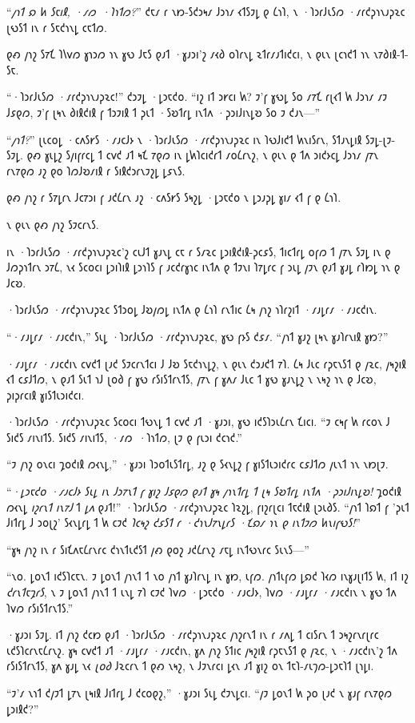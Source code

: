 “\emph{𐑢𐑪𐑑 𐑸 𐑿 𐑕𐑱𐑦𐑙, ·𐑥𐑼~·𐑐𐑪𐑑𐑼?}” 𐑒𐑱𐑥 𐑩 𐑯𐑽-𐑕𐑒𐑮𐑰𐑥 𐑓𐑮𐑪𐑥 𐑬𐑑𐑕𐑲𐑛 𐑞 𐑖𐑪𐑐, 𐑯 ·𐑐𐑮𐑩𐑓𐑧𐑕𐑼 ·𐑥𐑩𐑒𐑜𐑪𐑯𐑨𐑜𐑷𐑤 𐑚𐑻𐑕𐑑 𐑦𐑯 𐑩 𐑕𐑱𐑒𐑪𐑯𐑛 𐑤𐑱𐑑𐑼.

𐑞𐑺 𐑢𐑪𐑟 𐑕𐑳𐑗 𐑐𐑘𐑫𐑼 𐑣𐑪𐑮𐑼 𐑪𐑯 𐑣𐑻 𐑓𐑱𐑕 𐑞𐑨𐑑 ·𐑣𐑨𐑮𐑦'𐑟 𐑥𐑬𐑔 𐑴𐑐𐑩𐑯𐑛 𐑷𐑑𐑩𐑥𐑨𐑑𐑦𐑒𐑤𐑦, 𐑯 𐑞𐑧𐑯 𐑚𐑤𐑪𐑒𐑑 𐑪𐑯 𐑯𐑳𐑔𐑦𐑙-𐑑-𐑕𐑱.

“·𐑐𐑮𐑩𐑓𐑧𐑕𐑼 ·𐑥𐑩𐑒𐑜𐑪𐑯𐑨𐑜𐑷𐑤!” 𐑒𐑮𐑲𐑛 ·𐑛𐑮𐑱𐑒𐑴. “𐑦𐑟 𐑦𐑑 𐑮𐑾𐑤𐑦 𐑿? 𐑲'𐑝 𐑣𐑻𐑛 𐑕𐑴 𐑥𐑳𐑗 𐑩𐑚𐑬𐑑 𐑿 𐑓𐑮𐑪𐑥 𐑥𐑲 𐑓𐑭𐑞𐑼, 𐑲'𐑝 𐑚𐑰𐑯 𐑔𐑦𐑙𐑒𐑦𐑙 𐑝 𐑑𐑮𐑲𐑦𐑙 𐑑 𐑜𐑧𐑑 ·𐑕𐑹𐑑𐑩𐑛 𐑦𐑯𐑑𐑵 ·𐑜𐑮𐑦𐑓𐑦𐑯𐑛𐑹 𐑕𐑴 𐑲 𐑒𐑨𐑯—”

“\emph{𐑢𐑪𐑑?}” 𐑚𐑧𐑤𐑴𐑛 ·𐑤𐑵𐑕𐑾𐑕 ·𐑥𐑨𐑤𐑓𐑶 𐑯 ·𐑐𐑮𐑩𐑓𐑧𐑕𐑼 ·𐑥𐑩𐑒𐑜𐑪𐑯𐑨𐑜𐑷𐑤 𐑦𐑯 𐑐𐑻𐑓𐑦𐑒𐑑 𐑿𐑯𐑦𐑕𐑩𐑯, 𐑕𐑑𐑨𐑯𐑛𐑦𐑙 𐑕𐑲𐑛-𐑚𐑲-𐑕𐑲𐑛. 𐑞𐑺 𐑣𐑧𐑛𐑟 𐑕𐑢𐑦𐑝𐑩𐑤𐑛 𐑑 𐑤𐑫𐑒 𐑨𐑑 𐑰𐑗 𐑳𐑞𐑼 𐑦𐑯 𐑛𐑿𐑐𐑤𐑦𐑒𐑩𐑑 𐑥𐑴𐑖𐑩𐑯𐑟, 𐑯 𐑞𐑧𐑯 𐑞 𐑑𐑵 𐑮𐑦𐑒𐑶𐑤𐑛 𐑓𐑮𐑪𐑥 𐑢𐑳𐑯 𐑩𐑯𐑳𐑞𐑼 𐑨𐑟 𐑞𐑴 𐑐𐑼𐑓𐑹𐑥𐑦𐑙 𐑩 𐑕𐑦𐑙𐑒𐑮𐑩𐑯𐑲𐑟𐑛 𐑛𐑭𐑯𐑕.

𐑞𐑺 𐑢𐑪𐑟 𐑩 𐑕𐑳𐑛𐑩𐑯 𐑓𐑤𐑳𐑮𐑦 𐑝 𐑨𐑒𐑖𐑩𐑯 𐑨𐑟 ·𐑤𐑵𐑕𐑾𐑕 𐑕𐑰𐑟𐑛 ·𐑛𐑮𐑱𐑒𐑴 𐑯 𐑛𐑮𐑨𐑜𐑛 𐑣𐑦𐑥 𐑬𐑑 𐑝 𐑞 𐑖𐑪𐑐.

𐑯 𐑞𐑧𐑯 𐑞𐑺 𐑢𐑪𐑟 𐑕𐑲𐑤𐑩𐑯𐑕.

𐑦𐑯 ·𐑐𐑮𐑩𐑓𐑧𐑕𐑼 ·𐑥𐑩𐑒𐑜𐑪𐑯𐑨𐑜𐑷𐑤'𐑟 𐑤𐑧𐑓𐑑 𐑣𐑨𐑯𐑛 𐑤𐑱 𐑩 𐑕𐑥𐑷𐑤 𐑛𐑮𐑦𐑙𐑒𐑦𐑙-𐑜𐑤𐑭𐑕, 𐑑𐑦𐑤𐑑𐑩𐑛 𐑴𐑝𐑼 𐑑 𐑢𐑳𐑯 𐑕𐑲𐑛 𐑦𐑯 𐑞 𐑓𐑼𐑜𐑪𐑑𐑩𐑯 𐑮𐑳𐑖, 𐑯𐑬 𐑕𐑤𐑴𐑤𐑦 𐑛𐑮𐑦𐑐𐑦𐑙 𐑛𐑮𐑪𐑐𐑕 𐑝 𐑨𐑤𐑒𐑩𐑣𐑪𐑤 𐑦𐑯𐑑𐑵 𐑞 𐑑𐑲𐑯𐑦 𐑐𐑳𐑛𐑩𐑤 𐑝 𐑮𐑧𐑛 𐑢𐑲𐑯 𐑞𐑨𐑑 𐑣𐑨𐑛 𐑩𐑐𐑽𐑛 𐑪𐑯 𐑞 𐑓𐑤𐑹.

·𐑐𐑮𐑩𐑓𐑧𐑕𐑼 ·𐑥𐑩𐑒𐑜𐑪𐑯𐑨𐑜𐑷𐑤 𐑕𐑑𐑮𐑴𐑛 𐑓𐑹𐑢𐑼𐑛 𐑦𐑯𐑑𐑵 𐑞 𐑖𐑪𐑐 𐑩𐑯𐑑𐑦𐑤 𐑖𐑰 𐑢𐑪𐑟 𐑪𐑐𐑩𐑟𐑦𐑑 ·𐑥𐑨𐑛𐑩𐑥 ·𐑥𐑨𐑤𐑒𐑦𐑯.

“·𐑥𐑨𐑛𐑩𐑥 ·𐑥𐑨𐑤𐑒𐑦𐑯,” 𐑕𐑧𐑛 ·𐑐𐑮𐑩𐑓𐑧𐑕𐑼 ·𐑥𐑩𐑒𐑜𐑪𐑯𐑨𐑜𐑷𐑤, 𐑣𐑻 𐑝𐑶𐑕 𐑒𐑭𐑥. “𐑢𐑪𐑑 𐑣𐑨𐑟 𐑚𐑰𐑯 𐑣𐑨𐑐𐑩𐑯𐑦𐑙 𐑣𐑽?”

·𐑥𐑨𐑛𐑩𐑥 ·𐑥𐑨𐑤𐑒𐑦𐑯 𐑤𐑫𐑒𐑑 𐑚𐑨𐑒 𐑕𐑲𐑤𐑩𐑯𐑑𐑤𐑦 𐑓 𐑓𐑹 𐑕𐑱𐑒𐑪𐑯𐑛𐑟, 𐑯 𐑞𐑧𐑯 𐑒𐑮𐑨𐑒𐑑 𐑳𐑐. 𐑖𐑰 𐑓𐑧𐑤 𐑩𐑜𐑱𐑯𐑕𐑑 𐑞 𐑢𐑷𐑤, 𐑢𐑰𐑟𐑦𐑙 𐑬𐑑 𐑤𐑭𐑓𐑑𐑼, 𐑯 𐑞𐑨𐑑 𐑕𐑧𐑑 𐑪𐑓 𐑚𐑴𐑔 𐑝 𐑣𐑻 𐑩𐑕𐑦𐑕𐑑𐑩𐑯𐑑𐑕, 𐑢𐑳𐑯 𐑝 𐑣𐑵𐑥 𐑓𐑧𐑤 𐑑 𐑣𐑻 𐑣𐑨𐑯𐑛𐑟 𐑯 𐑯𐑰𐑟 𐑪𐑯 𐑞 𐑓𐑤𐑹, 𐑜𐑦𐑜𐑩𐑤𐑦𐑙 𐑣𐑦𐑕𐑑𐑧𐑮𐑦𐑒𐑤𐑦.

·𐑐𐑮𐑩𐑓𐑧𐑕𐑼 ·𐑥𐑩𐑒𐑜𐑪𐑯𐑨𐑜𐑷𐑤 𐑕𐑤𐑴𐑤𐑦 𐑑𐑻𐑯𐑛 𐑑 𐑤𐑫𐑒 𐑨𐑑 ·𐑣𐑨𐑮𐑦, 𐑣𐑻 𐑦𐑒𐑕𐑐𐑮𐑧𐑖𐑩𐑯 𐑗𐑦𐑤𐑦. “𐑲 𐑤𐑰𐑝 𐑿 𐑩𐑤𐑴𐑯 𐑓 𐑕𐑦𐑒𐑕 𐑥𐑦𐑯𐑦𐑑𐑕. 𐑕𐑦𐑒𐑕 𐑥𐑦𐑯𐑦𐑑𐑕, ·𐑥𐑼~·𐑐𐑪𐑑𐑼, 𐑚𐑲 𐑞 𐑝𐑧𐑮𐑦 𐑒𐑤𐑪𐑒.”

“𐑲 𐑢𐑪𐑟 𐑴𐑯𐑤𐑦 𐑡𐑴𐑒𐑦𐑙 𐑼𐑬𐑯𐑛,” ·𐑣𐑨𐑮𐑦 𐑐𐑮𐑴𐑑𐑧𐑕𐑑𐑩𐑛, 𐑨𐑟 𐑞 𐑕𐑬𐑯𐑛𐑟 𐑝 𐑣𐑦𐑕𐑑𐑧𐑮𐑦𐑒𐑩𐑤 𐑤𐑭𐑓𐑑𐑼 𐑢𐑧𐑯𐑑 𐑪𐑯 𐑯𐑽𐑚𐑲.

“\emph{·𐑛𐑮𐑱𐑒𐑴 ·𐑥𐑨𐑤𐑓𐑶 𐑕𐑧𐑛 𐑦𐑯 𐑓𐑮𐑳𐑯𐑑 𐑝 𐑣𐑦𐑟 𐑓𐑭𐑞𐑼 𐑞𐑨𐑑 𐑣𐑰 𐑢𐑪𐑯𐑑𐑩𐑛 𐑑 𐑚𐑰 𐑕𐑹𐑑𐑩𐑛 𐑦𐑯𐑑𐑵 ·𐑜𐑮𐑦𐑓𐑦𐑯𐑛𐑹!} 𐑡𐑴𐑒𐑦𐑙 𐑼𐑬𐑯𐑛 \emph{𐑦𐑟𐑩𐑯𐑑 𐑦𐑯𐑳𐑓} 𐑑 \emph{𐑛𐑵} 𐑞𐑨𐑑!” ·𐑐𐑮𐑩𐑓𐑧𐑕𐑼 ·𐑥𐑩𐑒𐑜𐑪𐑯𐑨𐑜𐑷𐑤 𐑐𐑷𐑟𐑛, 𐑝𐑦𐑟𐑩𐑚𐑤𐑦 𐑑𐑱𐑒𐑦𐑙 𐑚𐑮𐑧𐑔𐑕. “𐑢𐑪𐑑 𐑐𐑸𐑑 𐑝 '𐑜𐑧𐑑 𐑓𐑦𐑑𐑩𐑛 𐑓 𐑮𐑴𐑚𐑟' 𐑕𐑬𐑯𐑛𐑩𐑛 𐑑 𐑿 𐑤𐑲𐑒 \emph{𐑐𐑤𐑰𐑟 𐑒𐑭𐑕𐑑 𐑩 ·𐑒𐑪𐑯𐑓𐑳𐑯𐑛𐑩𐑕 ·𐑗𐑸𐑥 𐑪𐑯 𐑞 𐑦𐑯𐑑𐑲𐑼 𐑿𐑯𐑦𐑝𐑻𐑕!}”

“𐑣𐑰 𐑢𐑪𐑟 𐑦𐑯 𐑩 𐑕𐑦𐑗𐑵𐑱𐑖𐑩𐑯𐑩𐑤 𐑒𐑪𐑯𐑑𐑧𐑒𐑕𐑑 𐑢𐑺 𐑞𐑴𐑟 𐑨𐑒𐑖𐑩𐑯𐑟 𐑥𐑱𐑛 𐑦𐑯𐑑𐑻𐑯𐑩𐑤 𐑕𐑧𐑯𐑕—”

“𐑯𐑴. 𐑛𐑴𐑯𐑑 𐑦𐑒𐑕𐑐𐑤𐑱𐑯. 𐑲 𐑛𐑴𐑯𐑑 𐑢𐑪𐑯𐑑 𐑑 𐑯𐑴 𐑢𐑪𐑑 𐑣𐑨𐑐𐑩𐑯𐑛 𐑦𐑯 𐑣𐑽, 𐑧𐑝𐑼. 𐑢𐑪𐑑𐑧𐑝𐑼 𐑛𐑸𐑒 𐑐𐑬𐑼 𐑦𐑯𐑣𐑨𐑚𐑦𐑑𐑕 𐑿, 𐑦𐑑 𐑦𐑟 \emph{𐑒𐑩𐑯𐑑𐑱𐑡𐑩𐑕}, 𐑯 𐑲 𐑛𐑴𐑯𐑑 𐑢𐑪𐑯𐑑 𐑑 𐑧𐑯𐑛 𐑳𐑐 𐑤𐑲𐑒 𐑐𐑫𐑼 ·𐑛𐑮𐑱𐑒𐑴 ·𐑥𐑨𐑤𐑓𐑶, 𐑐𐑫𐑼 ·𐑥𐑨𐑛𐑩𐑥 ·𐑥𐑨𐑤𐑒𐑦𐑯 𐑯 𐑣𐑻 𐑑𐑵 𐑐𐑫𐑼 𐑩𐑕𐑦𐑕𐑑𐑩𐑯𐑑𐑕.”

·𐑣𐑨𐑮𐑦 𐑕𐑲𐑛. 𐑦𐑑 𐑢𐑪𐑟 𐑒𐑤𐑽 𐑞𐑨𐑑 ·𐑐𐑮𐑩𐑓𐑧𐑕𐑼 ·𐑥𐑩𐑒𐑜𐑪𐑯𐑨𐑜𐑷𐑤 𐑢𐑪𐑟𐑩𐑯𐑑 𐑦𐑯 𐑩 𐑥𐑵𐑛 𐑑 𐑤𐑦𐑕𐑩𐑯 𐑑 𐑮𐑰𐑟𐑩𐑯𐑩𐑚𐑩𐑤 𐑧𐑒𐑕𐑐𐑤𐑩𐑯𐑱𐑖𐑩𐑯𐑟. 𐑣𐑰 𐑤𐑫𐑒𐑑 𐑨𐑑 ·𐑥𐑨𐑛𐑩𐑥 ·𐑥𐑨𐑤𐑒𐑦𐑯, 𐑣𐑵 𐑢𐑪𐑟 𐑕𐑑𐑦𐑤 𐑢𐑰𐑟𐑦𐑙 𐑩𐑜𐑱𐑯𐑕𐑑 𐑞 𐑢𐑷𐑤, 𐑯 ·𐑥𐑨𐑤𐑒𐑦𐑯'𐑟 𐑑𐑵 𐑩𐑕𐑦𐑕𐑑𐑩𐑯𐑑𐑕, 𐑣𐑵 𐑣𐑨𐑛 𐑯𐑬 \emph{𐑚𐑴𐑔} 𐑓𐑷𐑤𐑩𐑯 𐑑 𐑞𐑺 𐑯𐑰𐑟, 𐑯 𐑓𐑲𐑯𐑩𐑤𐑦 𐑛𐑬𐑯 𐑨𐑑 𐑣𐑦𐑟 𐑴𐑯 𐑑𐑱𐑐-𐑥𐑧𐑠𐑼-𐑛𐑮𐑱𐑐𐑑 𐑚𐑪𐑛𐑦.

“𐑲'𐑥 𐑯𐑪𐑑 𐑒𐑢𐑲𐑑 𐑛𐑳𐑯 𐑚𐑰𐑦𐑙 𐑓𐑦𐑑𐑩𐑛 𐑓 𐑒𐑤𐑴𐑞𐑟,” ·𐑣𐑨𐑮𐑦 𐑕𐑧𐑛 𐑒𐑲𐑯𐑛𐑤𐑦. “𐑢𐑲 𐑛𐑴𐑯𐑑 𐑿 𐑜𐑴 𐑚𐑨𐑒 𐑯 𐑣𐑨𐑝 𐑩𐑯𐑳𐑞𐑼 𐑛𐑮𐑦𐑙𐑒?”

